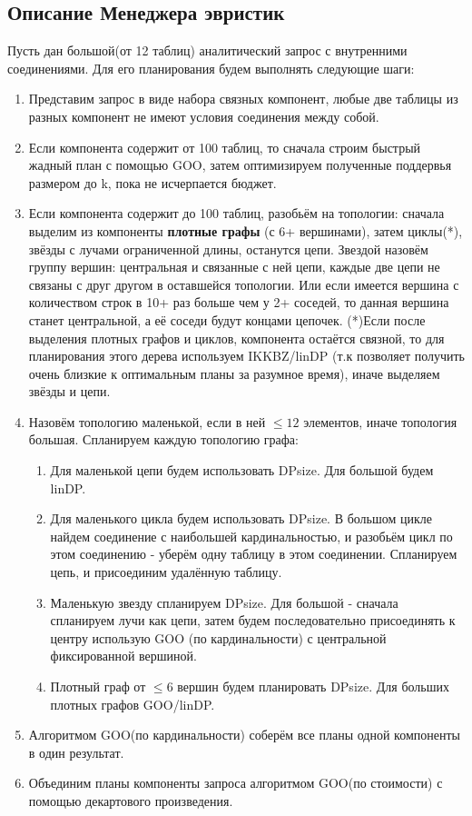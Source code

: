 \documentclass[12pt]{article}
\begin{document}
\begin{flushleft}
\section*{Описание Менеджера эвристик}

Пусть дан большой(от 12 таблиц) аналитический запрос с внутренними соединениями. Для его планирования будем выполнять 
следующие шаги:
\begin{enumerate}
    \item Представим запрос в виде набора связных компонент, любые две таблицы из разных компонент не имеют условия соединения между собой. 
    \item Если компонента содержит от 100 таблиц, то сначала строим быстрый жадный план с помощью GOO, затем оптимизируем полученные поддервья размером до k, пока не исчерпается бюджет.
    \item Если компонента содержит до 100 таблиц, разобьём на топологии: сначала выделим из компоненты \textbf{плотные графы} (с 6+ вершинами), затем циклы(*), звёзды с лучами ограниченной длины, останутся цепи. 
    Звездой назовём группу вершин: центральная и связанные с ней цепи, каждые две цепи не связаны с друг другом в оставшейся топологии. Или если имеется 
    вершина с количеством строк в 10+ раз больше чем у 2+ соседей, то данная вершина станет центральной, а её соседи будут концами цепочек.
    \newline (*)Если после выделения  плотных графов и циклов, компонента остаётся связной, то для планирования этого дерева используем IKKBZ/linDP (т.к позволяет получить очень близкие к оптимальным планы за разумное время), иначе выделяем звёзды и цепи.
    \item Назовём топологию маленькой, если в ней $\leq 12$ элементов, иначе топология большая. Спланируем каждую топологию графа:\newline
    \begin{enumerate}
        \item Для маленькой цепи будем использовать DPsize. Для большой будем linDP.
        \item Для маленького цикла будем использовать DPsize. В большом цикле найдем соединение с наибольшей кардинальностью, и разобьём цикл 
        по этом соединению - уберём одну таблицу в этом соединении. Спланируем цепь, и присоединим удалённую таблицу.
        \item Маленькую звезду спланируем DPsize. Для большой - сначала спланируем лучи как цепи, затем будем последовательно присоединять к 
        центру использую GOO (по кардинальности) с центральной фиксированной вершиной.
        \item Плотный граф от $\leq 6$ вершин будем планировать DPsize. Для больших плотных графов GOO/linDP.
    \end{enumerate}
    \item Алгоритмом GOO(по кардинальности) соберём все планы одной компоненты в один результат.
    \item Объединим планы компоненты запроса алгоритмом GOO(по стоимости) с помощью декартового произведения.
\end{enumerate}


\raggedright

\end{flushleft}
\end{document}
